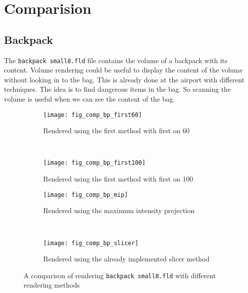 \section{Comparision}\label{Sec:Com}
\subsection{Backpack}
The \texttt{backpack small8.fld} file contains the volume of a backpack with its content. 
Volume rendering could be useful to display the content of the volume without looking in to the bag.
This is already done at the airport with different techniques.
The idea is to find dangerous items in the bag. 
So scanning the volume is useful when we can see the content of the bag. 
\begin{figure}[H]
	\centering
	\begin{subfigure}[t]{0.45\textwidth}
		\texttt{[image: fig\_comp\_bp\_first60]}
		\caption{Rendered using the first method with first on 60}
	\end{subfigure}
	~%
	\begin{subfigure}[t]{0.45\textwidth}
		\texttt{[image: fig\_comp\_bp\_first100]}
		\caption{Rendered using the first method with first on 100}
	\end{subfigure}
	
	\begin{subfigure}[t]{0.45\textwidth}
		\texttt{[image: fig\_comp\_bp\_mip]}
		\caption{Rendered using the maximum intensity projection}
	\end{subfigure}
	~%
	\begin{subfigure}[t]{0.45\textwidth}
		\texttt{[image: fig\_comp\_bp\_slicer]}
		\caption{Rendered using the already implemented slicer method}
	\end{subfigure}
	\caption{A comparison of rendering \texttt{backpack small8.fld} with different rendering methods}
	\label{fig:comp:bp}
\end{figure}
	
